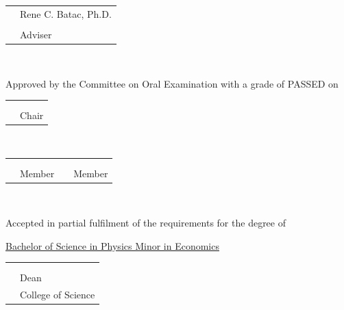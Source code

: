 \documentclass[12pt,letterpaper]{report}
\begin{document}
\begin{flushright}
	\begin{tabular}{@{}p{.5in}p{2.5in}@{}}
		& \quad \quad \quad   Rene C. Batac, Ph.D.\\
		& \hrulefill \\
		& \quad \quad \quad \quad \quad \quad Adviser \\
	\end{tabular}
	\\
\end{flushright}


\begin{flushleft}
Approved by the Committee on Oral Examination with a grade of PASSED on\\
\end{flushleft}
\makebox[1in]{\hrulefill}

\begin{center}
	\begin{tabular}{@{}p{.5in}p{2.5in}@{}}
		& \quad \quad \qquad   \\
		& \hrulefill \\
		& \quad \quad \quad \quad \qquad  Chair \\
	\end{tabular}
	\\
	\begin{tabular}{@{}p{.5in}p{2in}@{}@{}p{.5in}p{2in}@{}}
		& \quad \quad \qquad  && \quad \quad \qquad \\
		& \hrulefill && \hrulefill\\
		& \quad \quad \quad \quad  Member && \quad \quad \quad \quad  Member\\
	\end{tabular}
	\\
\end{center}


\begin{flushleft}
	Accepted in partial fulfilment of the requirements for the degree of \\
\end{flushleft}


\begin{center}
\underline{\hspace{0.5in} Bachelor of Science in Physics Minor in Economics \hspace{0.5in}}
\end{center} 

\begin{flushright}
\begin{tabular}{@{}p{.5in}p{2.5in}@{}}
	& \quad \quad \quad  \\
	& \hrulefill \\
	& \quad \quad \quad \quad \quad \quad Dean \\
	& \quad \quad \quad College of Science \\
\end{tabular}
\end{flushright}
\pagebreak
\end{document}
